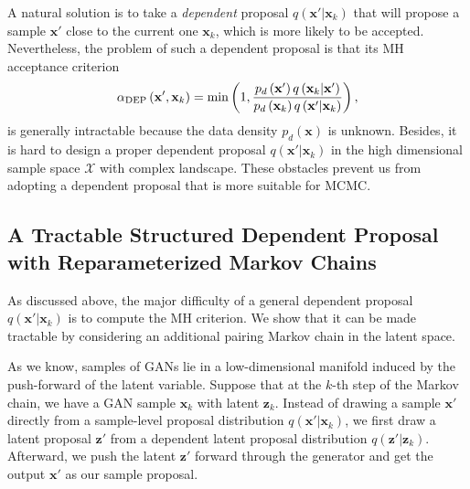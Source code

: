 \documentclass[runningheads]{llncs}
\newcommand{\bx}{\mathbf{x}}
\newcommand{\bz}{\mathbf{z}}
\newcommand{\cX}{\mathcal{X}}
\newcommand{\<}{\left\langle}
\renewcommand{\>}{\right\rangle}
\begin{document}
A natural solution is to take a \textit{dependent} proposal $q(\bx'|\bx_k)$ that will propose a sample $\bx'$ close to the current one $\bx_k$, which is more likely to be accepted. 
Nevertheless, the problem of such a dependent proposal is that its MH acceptance criterion
\begin{equation}
    \alpha_{\rm DEP}\left(\mathbf{x}^{\prime}, \mathbf{x}_{k}\right)=\min \left(1, \frac{p_d\left(\mathbf{x}^{\prime}\right) q\left(\mathbf{x}_{k}|\bx'\right)}{p_d\left(\mathbf{x}_{k}\right) q\left(\mathbf{x}^{\prime}|\bx_k\right)}\right),
    \label{eq:dependent-proposal-acceptance}
\end{equation}
is generally intractable because the data density $p_d(\bx)$ is unknown. Besides, it is hard to design a proper dependent proposal $q(\bx'|\bx_k)$ in the high dimensional sample space $\cX$ with complex landscape. These obstacles prevent us from adopting a dependent proposal that is more suitable for MCMC.

\subsection{A Tractable Structured Dependent Proposal with Reparameterized Markov Chains}
As discussed above, the major difficulty of a general dependent proposal $q(\bx'|\bx_k)$ is to compute the MH criterion. We show that it can be made tractable by considering an additional pairing Markov chain in the latent space.

As we know, samples of GANs lie in a low-dimensional manifold induced by the push-forward of the latent variable. Suppose that at the $k$-th step of the Markov chain, we have a GAN sample $\bx_k$ with latent $\bz_k$. Instead of drawing a sample $\bx'$ directly from a sample-level proposal distribution $q(\bx'|\bx_k)$, we first draw a latent proposal $\bz'$ from a dependent latent proposal distribution $q(\bz'|\bz_k)$. Afterward, we push the latent $\bz'$ forward through the generator and get the output $\bx'$ as our sample proposal. 
\end{document}
